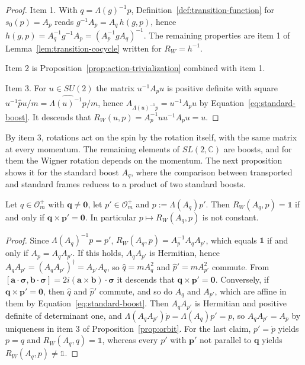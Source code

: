 \begin{proof}
	Item 1. With $q=\Lambda(g)^{-1}p$, Definition~\ref{def:transition-function} for $s_0(p)=A_p$ reads $g^{-1}A_p=A_q\,h(g,p)$, hence $h(g,p)=A_q^{-1}g^{-1}A_p=(A_p^{-1}gA_q)^{-1}$. The remaining properties are item 1 of Lemma~\ref{lem:transition-cocycle} written for $R_W=h^{-1}$.
	
	Item 2 is Proposition~\ref{prop:action-trivialization} combined with item 1.
	
	Item 3. For $u\in SU(2)$ the matrix $u^{-1}A_pu$ is positive definite with square $u^{-1}\hat{p}u/m=\widehat{\Lambda(u)^{-1}p}/m$, hence $A_{\Lambda(u)^{-1}p}=u^{-1}A_pu$ by Equation~\eqref{eq:standard-boost}. It descends that $R_W(u,p)=A_p^{-1}uu^{-1}A_pu=u$.
\end{proof}

By item 3, rotations act on the spin by the rotation itself, with the same matrix at every momentum. The remaining elements of $SL(2,\mathbb{C})$ are boosts, and for them the Wigner rotation depends on the momentum. The next proposition shows it for the standard boost $A_q$, where the comparison between transported and standard frames reduces to a product of two standard boosts.

\begin{proposition}\label{prop:wigner-rotation}
	Let $q\in\mathcal{O}_m^+$ with $\mathbf{q}\neq\mathbf{0}$, let $p'\in\mathcal{O}_m^+$ and $p:=\Lambda(A_q)p'$. Then $R_W(A_q,p)=\mathbb{1}$ if and only if $\mathbf{q}\times\mathbf{p}'=\mathbf{0}$. In particular $p\mapsto R_W(A_q,p)$ is not constant.
\end{proposition}

\begin{proof}
	Since $\Lambda(A_q)^{-1}p=p'$, $R_W(A_q,p)=A_p^{-1}A_qA_{p'}$, which equals $\mathbb{1}$ if and only if $A_p=A_qA_{p'}$. If this holds, $A_qA_{p'}$ is Hermitian, hence $A_qA_{p'}=(A_qA_{p'})^\dagger=A_{p'}A_q$, so $\hat{q}=mA_q^2$ and $\hat{p}'=mA_{p'}^2$ commute. From $[\mathbf{a}\cdot\boldsymbol{\sigma},\mathbf{b}\cdot\boldsymbol{\sigma}]=2i(\mathbf{a}\times\mathbf{b})\cdot\boldsymbol{\sigma}$ it descends that $\mathbf{q}\times\mathbf{p}'=\mathbf{0}$. Conversely, if $\mathbf{q}\times\mathbf{p}'=\mathbf{0}$, then $\hat{q}$ and $\hat{p}'$ commute, and so do $A_q$ and $A_{p'}$, which are affine in them by Equation~\eqref{eq:standard-boost}. Then $A_qA_{p'}$ is Hermitian and positive definite of determinant one, and $\Lambda(A_qA_{p'})\mathring{p}=\Lambda(A_q)p'=p$, so $A_qA_{p'}=A_p$ by uniqueness in item 3 of Proposition~\ref{prop:orbit}. For the last claim, $p'=\mathring{p}$ yields $p=q$ and $R_W(A_q,q)=\mathbb{1}$, whereas every $p'$ with $\mathbf{p}'$ not parallel to $\mathbf{q}$ yields $R_W(A_q,p)\neq\mathbb{1}$.
\end{proof}

